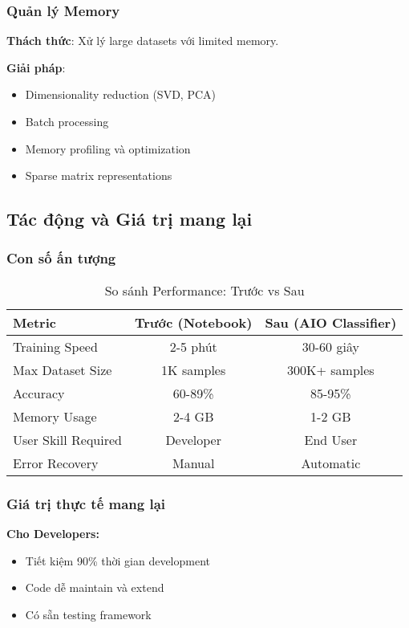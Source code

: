 \subsubsection{Quản lý Memory}

\textbf{Thách thức}: Xử lý large datasets với limited memory.

\textbf{Giải pháp}:
\begin{itemize}
    \item Dimensionality reduction (SVD, PCA)
    \item Batch processing
    \item Memory profiling và optimization
    \item Sparse matrix representations
\end{itemize}

\subsection{Tác động và Giá trị mang lại}

\subsubsection{Con số ấn tượng}

\begin{table}[H]
\centering
\begin{tabular}{|l|c|c|}
\hline
\textbf{Metric} & \textbf{Trước (Notebook)} & \textbf{Sau (AIO Classifier)} \\
\hline
Training Speed & 2-5 phút & 30-60 giây \\
\hline
Max Dataset Size & 1K samples & 300K+ samples \\
\hline
Accuracy & 60-89\% & 85-95\% \\
\hline
Memory Usage & 2-4 GB & 1-2 GB \\
\hline
User Skill Required & Developer & End User \\
\hline
Error Recovery & Manual & Automatic \\
\hline
\end{tabular}
\caption{So sánh Performance: Trước vs Sau}
\end{table}

\subsubsection{Giá trị thực tế mang lại}

\textbf{Cho Developers:}
\begin{itemize}
    \item Tiết kiệm 90\% thời gian development
    \item Code dễ maintain và extend
    \item Có sẵn testing framework
\end{itemize}

